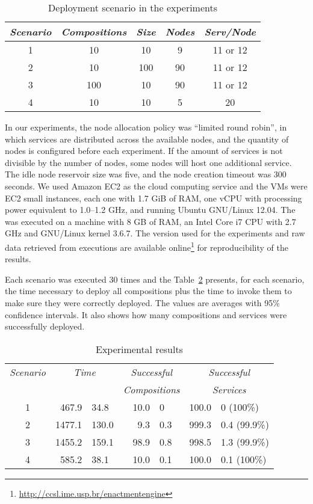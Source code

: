 \begin{table}
\centering
\caption{Deployment scenario in the experiments}
\label{tab:cases}
\begin{tabular}{c c c c c} \hline
\emph{Scenario} & \emph{Compositions} & \emph{Size} & \emph{Nodes} & \emph{Serv/Node} \\ \hline
1 &  10 &  10 &  9 & 11 or 12 \\
2 &  10 & 100 & 90 & 11 or 12 \\
3 & 100 &  10 & 90 & 11 or 12 \\
4 &  10 &  10 &  5 &       20 \\
\hline \end{tabular}
\end{table}

In our experiments, 
the node allocation policy was ``limited round robin'',
in which services are distributed across the available nodes,
and the quantity of nodes is configured before each experiment.
If the amount of services is not divisible by the number of nodes,
some nodes will host one additional service.
The idle node reservoir size was five,
and the node creation timeout was 300 seconds.
We used Amazon EC2
as the cloud computing service and the VMs were EC2 small instances,
each one with 1.7 GiB of RAM, one vCPU
with processing power equivalent to 1.0--1.2 GHz,
and running Ubuntu GNU/Linux 12.04.
The \ee was executed on a machine with 8 GB of
RAM, an Intel Core i7 CPU with 2.7 GHz and GNU/Linux kernel 3.6.7.
The \ee version used for the experiments
and raw data retrieved from executions
are available online\footnote{\url{http://ccsl.ime.usp.br/enactmentengine}} for reproducibility of the results.

Each scenario was executed 30 times
and the Table~\ref{tab:results} presents, for each scenario,
the time necessary to deploy all compositions
plus the time to invoke them to make sure they were correctly deployed.
The values are averages with 95\% confidence intervals.
It also shows how many compositions and services were successfully deployed.

\begin{table}
\centering
\caption{Experimental results}
\label{tab:results}
\begin{tabular}{c r@{ $\pm$ }l r@{ $\pm$ }l r@{ $\pm$ }l} \hline

\emph{Scenario} & \multicolumn{2}{c}{\emph{Time}} & \multicolumn{2}{c}{\emph{Successful}}   & \multicolumn{2}{c}{\emph{Successful}}\\
                 & \multicolumn{2}{c}{}           & \multicolumn{2}{c}{\emph{Compositions}} & \multicolumn{2}{c}{\emph{Services}}\\
\hline
1 &  467.9 &  34.8 & 10.0 & 0   & 100.0 & 0   (100\%) \\
2 & 1477.1 & 130.0 &  9.3 & 0.3 & 999.3 & 0.4 (99.9\%)\\
3 & 1455.2 & 159.1 & 98.9 & 0.8 & 998.5 & 1.3 (99.9\%)\\
4 &  585.2 &  38.1 & 10.0 & 0.1 & 100.0 & 0.1 (100\%)\\
\hline \end{tabular}
\end{table}

